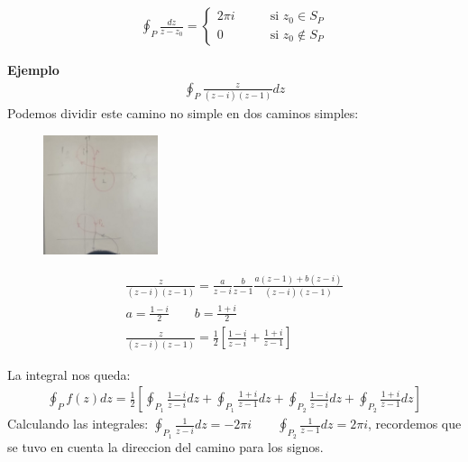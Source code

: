 \documentclass{article}
\begin{document}
\begin{gather*}
  \displaystyle\oint_{P }^{} \frac{dz }{z - z_0 } = \begin{cases}
    2\pi i \qquad &\text{si }z_0 \in S_P \\
    0 &\text{si }z_0 \notin S_P
  \end{cases}
\end{gather*}

\textbf{Ejemplo } 
\begin{gather*}
  \displaystyle\oint_{P}^{} \frac{z }{(z-i)(z-1)}dz 
\end{gather*}
Podemos dividir este camino no simple en dos caminos simples: 

\begin{figure}[H]
  \begin{center}
    \includegraphics[width=0.3\textwidth]{camino_complejo.png}
  \end{center}
\end{figure}


\begin{gather*}
  \frac{z }{(z-i)(z-1)} = \frac{a}{z-i }\frac{b }{z-1 } \frac{a(z-1)+b(z-i ) }{(z-i)(z-1)}\\
  a = \frac{1-i }{2 }\qquad b = \frac{1 +i }{2 } \\
  \frac{z }{(z-i)(z-1)} = \frac{1}{2}\left[\frac{1 - i }{z-i } + \frac{1 + i }{z - 1 }\right] 
\end{gather*}

La integral nos queda: 
\begin{gather*}
  \displaystyle\oint_{P }^{} f(z)dz = \frac{1}{2}\left[\displaystyle\oint_{P_1 }^{} \frac{1 - i }{z - i } dz + \displaystyle\oint_{P_1 }^{} \frac{1 + i }{z - 1 }dz + \displaystyle\oint_{P_2 }^{} \frac{1 - i }{z - i } dz + \displaystyle\oint_{P_2 }^{} \frac{1 + i }{z - 1 }dz\right]
\end{gather*}
Calculando las integrales: $ \oint_{P_1} \frac{1}{z-i }dz = -2 \pi i  \qquad \oint_{P_2} \frac{1}{z - 1 } dz = 2 \pi i  $, recordemos que se tuvo en cuenta la direccion del camino para los signos.
\end{document}
